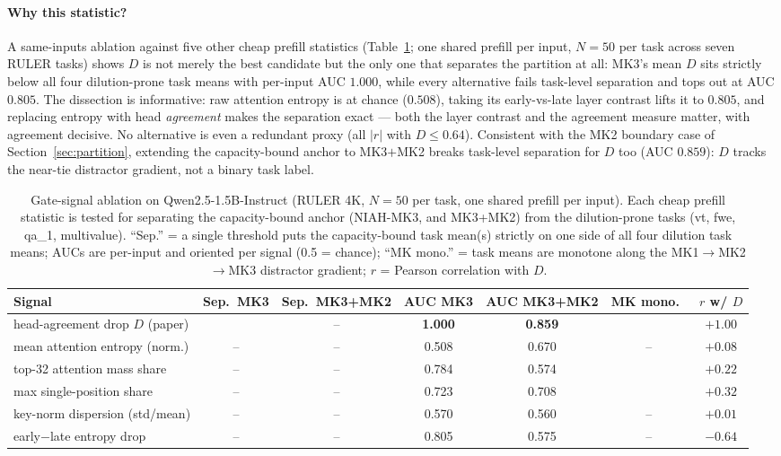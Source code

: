 \documentclass{article}
\newcommand{\yes}{\checkmark}
\newcommand{\no}{--}
\begin{document}
\paragraph{Why this statistic?} A same-inputs ablation against five other
cheap prefill statistics (Table~\ref{tab:signal-ablation}; one shared
prefill per input, $N = 50$ per task across seven RULER tasks) shows $D$
is not merely the best candidate but the only one that separates the
partition at all: MK3's mean $D$ sits strictly below all four
dilution-prone task means with per-input AUC $1.000$, while every
alternative fails task-level separation and tops out at AUC $0.805$.
The dissection is informative: raw attention entropy is at chance
($0.508$), taking its early-vs-late layer contrast lifts it to $0.805$,
and replacing entropy with head \emph{agreement} makes the separation
exact --- both the layer contrast and the agreement measure matter, with
agreement decisive. No alternative is even a redundant proxy (all
$|r|$ with $D \le 0.64$). Consistent with the MK2 boundary case of
Section~\ref{sec:partition}, extending the capacity-bound anchor to
MK3$+$MK2 breaks task-level separation for $D$ too (AUC $0.859$): $D$
tracks the near-tie distractor gradient, not a binary task label.

\begin{table}[t]
\centering
\caption{Gate-signal ablation on Qwen2.5-1.5B-Instruct (RULER 4K, $N=50$ per
task, one shared prefill per input). Each cheap prefill statistic is tested
for separating the capacity-bound anchor (NIAH-MK3, and MK3+MK2) from the
dilution-prone tasks (vt, fwe, qa\_1, multivalue). ``Sep.'' = a single
threshold puts the capacity-bound task mean(s) strictly on one side of all
four dilution task means; AUCs are per-input and oriented per signal
(0.5 = chance); ``MK mono.'' = task means are monotone along the
MK1$\to$MK2$\to$MK3 distractor gradient; $r$ = Pearson correlation with $D$.}
\label{tab:signal-ablation}
\begin{tabular}{lcccccc}
\toprule
Signal & Sep.\ MK3 & Sep.\ MK3+MK2 & AUC MK3 & AUC MK3+MK2 & MK mono.\ & $r$ w/ $D$ \\
\midrule
head-agreement drop $D$ (paper) & \yes & \no & \textbf{1.000} & \textbf{0.859} & \yes & $+1.00$ \\
mean attention entropy (norm.) & \no & \no & 0.508 & 0.670 & \no & $+0.08$ \\
top-32 attention mass share & \no & \no & 0.784 & 0.574 & \yes & $+0.22$ \\
max single-position share & \no & \no & 0.723 & 0.708 & \yes & $+0.32$ \\
key-norm dispersion (std/mean) & \no & \no & 0.570 & 0.560 & \no & $+0.01$ \\
early$-$late entropy drop & \no & \no & 0.805 & 0.575 & \no & $-0.64$ \\
\bottomrule
\end{tabular}
\end{table}
\end{document}
